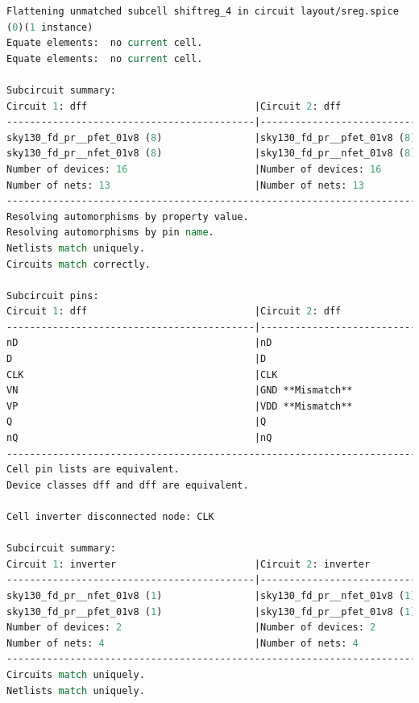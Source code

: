 \documentclass[11pt]{article}
\begin{document}
    \begin{lstlisting}[language=tcl, caption=\textbf{Layout versus Schematic for 4-bit Shift Register with Inverter}]
Flattening unmatched subcell shiftreg_4 in circuit layout/sreg.spice 
(0)(1 instance)
Equate elements:  no current cell.
Equate elements:  no current cell.

Subcircuit summary:
Circuit 1: dff                             |Circuit 2: dff                             
-------------------------------------------|-------------------------------------------
sky130_fd_pr__pfet_01v8 (8)                |sky130_fd_pr__pfet_01v8 (8)                
sky130_fd_pr__nfet_01v8 (8)                |sky130_fd_pr__nfet_01v8 (8)                
Number of devices: 16                      |Number of devices: 16                      
Number of nets: 13                         |Number of nets: 13                         
---------------------------------------------------------------------------------------
Resolving automorphisms by property value.
Resolving automorphisms by pin name.
Netlists match uniquely.
Circuits match correctly.

Subcircuit pins:
Circuit 1: dff                             |Circuit 2: dff                             
-------------------------------------------|-------------------------------------------
nD                                         |nD                                         
D                                          |D                                          
CLK                                        |CLK                                        
VN                                         |GND **Mismatch**                           
VP                                         |VDD **Mismatch**                           
Q                                          |Q                                          
nQ                                         |nQ                                         
---------------------------------------------------------------------------------------
Cell pin lists are equivalent.
Device classes dff and dff are equivalent.

Cell inverter disconnected node: CLK

Subcircuit summary:
Circuit 1: inverter                        |Circuit 2: inverter                        
-------------------------------------------|-------------------------------------------
sky130_fd_pr__nfet_01v8 (1)                |sky130_fd_pr__nfet_01v8 (1)                
sky130_fd_pr__pfet_01v8 (1)                |sky130_fd_pr__pfet_01v8 (1)                
Number of devices: 2                       |Number of devices: 2                       
Number of nets: 4                          |Number of nets: 4                          
---------------------------------------------------------------------------------------
Circuits match uniquely.
Netlists match uniquely.


\end{lstlisting}
\end{document}
